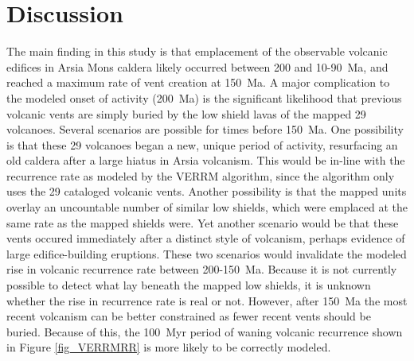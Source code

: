 
\section{Discussion}
The main finding in this study is that emplacement of the observable volcanic edifices in Arsia Mons caldera likely occurred between 200 and 10-90~Ma, and reached a maximum rate of vent creation at 150~Ma. A major complication to the modeled onset of activity (200~Ma) is the significant likelihood that previous volcanic vents are simply buried by the low shield lavas of the mapped 29 volcanoes. Several scenarios are possible for times before 150~Ma. One possibility is that these 29 volcanoes began a new, unique period of activity, resurfacing an old caldera after a large hiatus in Arsia volcanism. This would be in-line with the recurrence rate as modeled by the VERRM algorithm, since the algorithm only uses the 29 cataloged volcanic vents. Another possibility is that the mapped units overlay an uncountable number of similar low shields, which were emplaced at the same rate as the mapped shields were. Yet another scenario would be that these vents occured immediately after a distinct style of volcanism, perhaps evidence of large edifice-building eruptions. These two scenarios would invalidate the modeled rise in volcanic recurrence rate between 200-150~Ma. Because it is not currently possible to detect what lay beneath the mapped low shields, it is unknown whether the rise in recurrence rate is real or not. However, after 150~Ma the most recent volcanism can be better constrained as fewer recent vents should be buried. Because of this, the 100~Myr period of waning volcanic recurrence shown in Figure \ref{fig_VERRMRR} is more likely to be correctly modeled.

